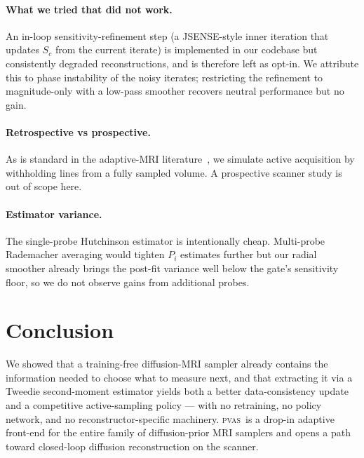 \documentclass[conference]{IEEEtran}
\newcommand{\PVAS}{\textsc{pvas}}
\begin{document}
\paragraph{What we tried that did not work.} An in-loop
sensitivity-refinement step (a JSENSE-style inner iteration that
updates $S_c$ from the current iterate) is implemented in our codebase
but consistently degraded reconstructions, and is therefore left as
opt-in. We attribute this to phase instability of the noisy iterates;
restricting the refinement to magnitude-only with a low-pass smoother
recovers neutral performance but no gain.

\paragraph{Retrospective vs prospective.} As is standard in the
adaptive-MRI literature~\cite{bakker2020experimental,pineda2020activerl},
we simulate active acquisition by withholding lines from a fully
sampled volume. A prospective scanner study is out of scope here.

\paragraph{Estimator variance.} The single-probe Hutchinson estimator
is intentionally cheap. Multi-probe Rademacher averaging would tighten
$P_i$ estimates further but our radial smoother already brings the
post-fit variance well below the gate's sensitivity floor, so we do
not observe gains from additional probes.

\section{Conclusion}\label{sec:conc}

We showed that a training-free diffusion-MRI sampler already contains
the information needed to choose what to measure next, and that
extracting it via a Tweedie second-moment estimator yields both a
better data-consistency update and a competitive active-sampling
policy --- with no retraining, no policy network, and no
reconstructor-specific machinery. \PVAS\ is a drop-in adaptive
front-end for the entire family of diffusion-prior MRI samplers and
opens a path toward closed-loop diffusion reconstruction on the
scanner.



\end{document}
